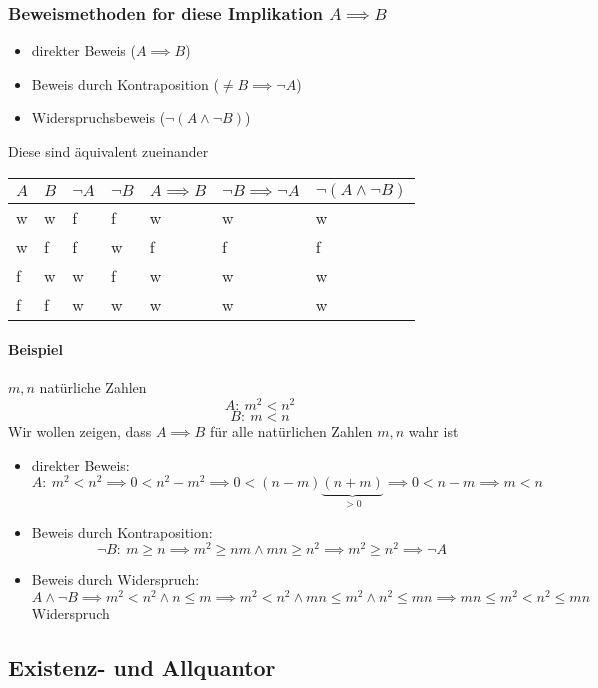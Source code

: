 \documentclass[a4paper]{scrartcl}
\theoremstyle{definition}
\theoremstyle{plain}
\theoremstyle{plain}
\theoremstyle{remark}
\theoremstyle{remark}
\theoremstyle{remark}
\theoremstyle{remark}
\theoremstyle{remark}
\begin{document}
\subsubsection{Beweismethoden for diese Implikation $A\implies B$}
\label{sec-2-2-2}
\begin{itemize}
\item direkter Beweis ($A\implies B$)
\item Beweis durch Kontraposition ($\neq B \implies \neg A$)
\item Widerspruchsbeweis ($\neg (A\wedge \neg B)$)
\end{itemize}
Diese sind äquivalent zueinander
\begin{center}
\begin{tabular}{lllllll}
$A$ & $B$ & $\neg A$ & $\neg B$ & $A\implies B$ & $\neg B \implies \neg A$ & $\neg (A \wedge \neg B)$\\
\hline
w & w & f & f & w & w & w\\
w & f & f & w & f & f & f\\
f & w & w & f & w & w & w\\
f & f & w & w & w & w & w\\
\end{tabular}
\end{center}
\paragraph{Beispiel}
\label{sec-2-2-2-1}
$m,n$ natürliche Zahlen \\
     \[A:~m^2 < n^2\]
\[B:~m < n\]
Wir wollen zeigen, dass $A\implies B$ für alle natürlichen Zahlen $m,n$ wahr ist
\begin{itemize}
\item direkter Beweis: \\
       \[A:~m^2 < n^2 \implies 0 < n^2 - m^2 \implies 0 < (n-m)\underbrace{(n+m)}_{>0} \implies 0 < n-m \implies m<n\]
\item Beweis durch Kontraposition: \\
       \[\neg B:~m \geq n \implies m^2\geq n m \wedge m n \geq n^2 \implies m^2 \geq n^2 \implies \neg A\]
\item Beweis durch Widerspruch: \\
       \[A\wedge \neg B \implies m^2 < n^2 \wedge n\leq m \implies m^2 < n^2 \wedge m n \leq m^2 \wedge n^2 \leq m n \implies m n \leq m^2 < n^2 \leq m n\]
       Widerspruch
\end{itemize}
\subsection{Existenz- und Allquantor}
\label{sec-2-3}
\end{document}
